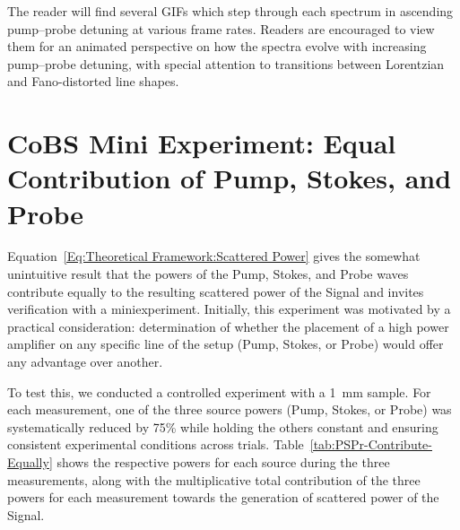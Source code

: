 \hfill

The reader will find several GIFs which step through each spectrum in ascending pump--probe detuning at various frame rates. Readers are encouraged to view them for an animated perspective on how the spectra evolve with increasing pump--probe detuning, with special attention to transitions between Lorentzian and Fano-distorted line shapes.

\newpage


\section{CoBS Mini Experiment: Equal Contribution of Pump, Stokes, and Probe}

Equation~\ref{Eq:Theoretical Framework:Scattered Power} gives the somewhat unintuitive result that the powers of the Pump, Stokes, and Probe waves contribute equally to the resulting scattered power of the Signal and invites verification with a miniexperiment. Initially, this experiment was motivated by a practical consideration: determination of whether the placement of a high power amplifier on any specific line of the setup (Pump, Stokes, or Probe) would offer any advantage over another.

To test this, we conducted a controlled experiment with a \SI{1}{\milli\meter}  sample. For each measurement, one of the three source powers (Pump, Stokes, or Probe) was systematically reduced by 75\% while holding the others constant and ensuring consistent experimental conditions across trials. Table~\ref{tab:PSPr-Contribute-Equally} shows the respective powers for each source during the three measurements, along with the multiplicative total contribution of the three powers for each measurement towards the generation of scattered power of the Signal.

